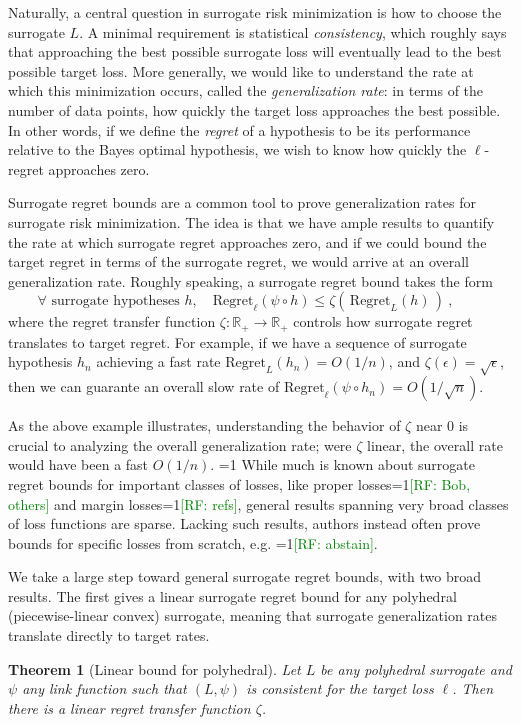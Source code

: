 \documentclass{article}
\newtheorem{theorem}{Theorem}
\newcommand{\Comments}{1}
\newcommand{\mynote}[2]{\ifnum\Comments=1\textcolor{#1}{#2}\fi}
\newcommand{\mytodo}[2]{\ifnum\Comments=1%
  \todo[linecolor=#1!80!black,backgroundcolor=#1,bordercolor=#1!80!black]{#2}\fi}
\newcommand{\raf}[1]{\mynote{green}{[RF: #1]}}
\newcommand{\raft}[1]{\mytodo{green!20!white}{RF: #1}}
\newcommand{\reals}{\mathbb{R}}
\newcommand{\Reg}{\mathrm{Regret}}
\begin{document}
Naturally, a central question in surrogate risk minimization is how to choose the surrogate $L$.
A minimal requirement is statistical \emph{consistency}, which roughly says that approaching the best possible surrogate loss will eventually lead to the best possible target loss.
More generally, we would like to understand the rate at which this minimization occurs, called the \emph{generalization rate}: in terms of the number of data points, how quickly the target loss approaches the best possible.
In other words, if we define the \emph{regret} of a hypothesis to be its performance relative to the Bayes optimal hypothesis, we wish to know how quickly the $\ell$-regret approaches zero.

Surrogate regret bounds are a common tool to prove generalization rates for surrogate risk minimization.
The idea is that we have ample results to quantify the rate at which surrogate regret approaches zero, and if we could bound the target regret in terms of the surrogate regret, we would arrive at an overall generalization rate.
Roughly speaking, a surrogate regret bound takes the form
\begin{equation}
  \label{eq:surrogate-regret-bound-informal}
  \forall \text{ surrogate hypotheses } h, \quad \Reg_\ell(\psi\circ h) \leq \zeta(\, \Reg_L(h) \,)~,\qquad
\end{equation}
where the regret transfer function $\zeta : \reals_+ \to \reals_+$ controls how surrogate regret translates to target regret.
For example, if we have a sequence of surrogate hypothesis $h_n$ achieving a fast rate $\Reg_L(h_n) = O(1/n)$, and $\zeta(\epsilon) = \sqrt{\epsilon}$, then we can guarante an overall slow rate of $\Reg_\ell(\psi \circ h_n) = O(1/\sqrt{n})$.

As the above example illustrates, understanding the behavior of $\zeta$ near $0$ is crucial to analyzing the overall generalization rate; were $\zeta$ linear, the overall rate would have been a fast $O(1/n)$.
\raft{Maybe a good place to cite the IEEE rates paper}
While much is known about surrogate regret bounds for important classes of losses, like proper losses\raf{Bob, others} and margin losses\raf{refs}, general results spanning very broad classes of loss functions are sparse.
Lacking such results, authors instead often prove bounds for specific losses from scratch, e.g. \raf{abstain}.

We take a large step toward general surrogate regret bounds, with two broad results.
The first gives a linear surrogate regret bound for any polyhedral (piecewise-linear convex) surrogate, meaning that surrogate generalization rates translate directly to target rates.
\begin{theorem}[Linear bound for polyhedral]
  \label{thm:main-upper}
  Let $L$ be any polyhedral surrogate and $\psi$ any link function such that $(L,\psi)$ is consistent for the target loss $\ell$.
  Then there is a linear regret transfer function $\zeta$.
\end{theorem}
\end{document}
